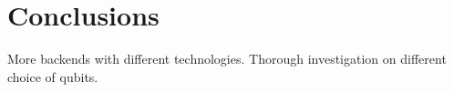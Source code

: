\chapter{Conclusions}
\label{sec:conclusions}

More backends with different technologies.
Thorough investigation on different choice of qubits.

